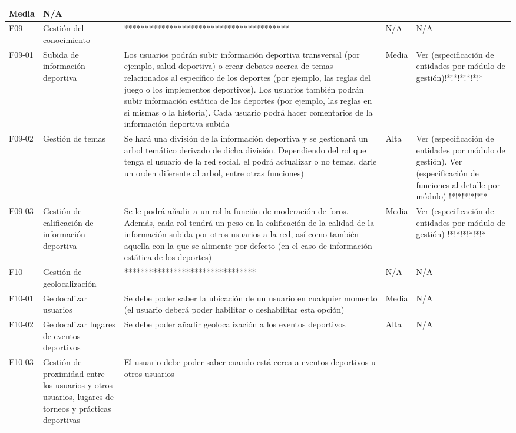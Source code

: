\begin{table}[!htb]
\begin{center}
\begin{supertabular}{|p{1cm}|p{4cm}|p{4cm}|p{2cm}|p{4cm}|}
			Media & 
			N/A \\
			\hline
			F09 & 
			Gestión del conocimiento & 
			**************************************** &
			N/A & 
			N/A \\
			\hline
			F09-01 & 
			Subida de información deportiva & 
			Los usuarios podrán subir información deportiva transversal (por ejemplo, salud deportiva) o crear debates acerca de temas relacionados al específico de los deportes (por ejemplo, las reglas del juego o los implementos deportivos). Los usuarios también podrán subir información estática de los deportes (por ejemplo, las reglas en si mismas o la historia). Cada usuario podrá hacer comentarios de la información deportiva subida &
			Media & 
			Ver (especificación de entidades por módulo de gestión)!*!*!*!*!*!* \\
			\hline
			F09-02 & 
			Gestión de temas & 
			Se hará una división de la información deportiva y se gestionará un arbol temático derivado de dicha división. Dependiendo del rol que tenga el usuario de la red social, el podrá actualizar o no temas, darle un orden diferente al arbol, entre otras funciones) &
			Alta & 
			Ver (especificación de entidades por módulo de gestión). Ver (especificación de funciones al detalle por módulo) !*!*!*!*!*!* \\
			\hline
			F09-03 & 
			Gestión de calificación de información deportiva & 
			Se le podrá añadir a un rol la función de moderación de foros. Además, cada rol tendrá un peso en la calificación de la calidad de la información subida por otros usuarios a la red, así como también aquella con la que se alimente por defecto (en el caso de información estática de los deportes) &
			Media & 
			Ver (especificación de entidades por módulo de gestión) !*!*!*!*!*!* \\
			\hline
			F10 & 
			Gestión de geolocalización & 
			******************************** &
			N/A & 
			N/A \\
			\hline
			F10-01 & 
			Geolocalizar usuarios & 
			Se debe poder saber la ubicación de un usuario en cualquier momento (el usuario deberá poder habilitar o deshabilitar esta opción) &
			Media & 
			N/A \\
			\hline
			F10-02 & 
			Geolocalizar lugares de eventos deportivos & 
			Se debe poder añadir geolocalización a los eventos deportivos &
			Alta & 
			N/A \\
			\hline
			F10-03 & 
			Gestión de proximidad entre los usuarios y otros usuarios, lugares de torneos y prácticas deportivas & 
			El usuario debe poder saber cuando está cerca a eventos deportivos u otros usuarios

\end{supertabular}
\end{center}
\end{table}

